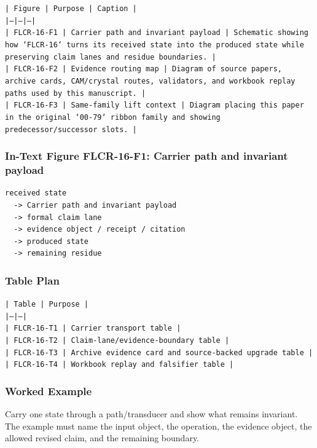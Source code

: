 \documentclass[11pt]{article}
\begin{document}
\noindent\texttt{| Figure | Purpose | Caption |}\\
\noindent\texttt{|---|---|---|}\\
\noindent\texttt{| FLCR-16-F1 | Carrier path and invariant payload | Schematic showing how `FLCR-16` turns its received state into the produced state while preserving claim lanes and residue boundaries. |}\\
\noindent\texttt{| FLCR-16-F2 | Evidence routing map | Diagram of source papers, archive cards, CAM/crystal routes, validators, and workbook replay paths used by this manuscript. |}\\
\noindent\texttt{| FLCR-16-F3 | Same-family lift context | Diagram placing this paper in the original `00-79` ribbon family and showing predecessor/successor slots. |}\\

\subsubsection*{In-Text Figure FLCR-16-F1: Carrier path and invariant payload}

\begin{verbatim}
received state
  -> Carrier path and invariant payload
  -> formal claim lane
  -> evidence object / receipt / citation
  -> produced state
  -> remaining residue
\end{verbatim}

\subsubsection*{Table Plan}

\noindent\texttt{| Table | Purpose |}\\
\noindent\texttt{|---|---|}\\
\noindent\texttt{| FLCR-16-T1 | Carrier transport table |}\\
\noindent\texttt{| FLCR-16-T2 | Claim-lane/evidence-boundary table |}\\
\noindent\texttt{| FLCR-16-T3 | Archive evidence card and source-backed upgrade table |}\\
\noindent\texttt{| FLCR-16-T4 | Workbook replay and falsifier table |}\\

\subsubsection*{Worked Example}

Carry one state through a path/transducer and show what remains invariant. The example must name the input object, the operation,
the evidence object, the allowed revised claim, and the remaining boundary.
\end{document}
